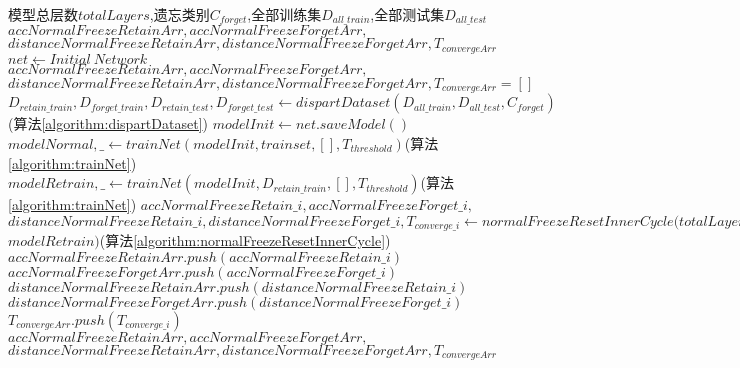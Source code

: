 \begin{algorithm}
	\renewcommand{\algorithmicrequire}{\textbf{Input:}}
	\renewcommand{\algorithmicensure}{\textbf{Output:}}
	\caption{正向冻结主算法 normalResetMain}
	\label{algorithm:normalResetMain}
	\begin{algorithmic}[1]
        \REQUIRE 模型总层数$totalLayers$,遗忘类别$C_{forget}$,全部训练集$D_{all\_train}$,全部测试集$D_{all\_test}$
        \ENSURE  $accNormalFreezeRetainArr,accNormalFreezeForgetArr,$\\$distanceNormalFreezeRetainArr,distanceNormalFreezeForgetArr,T_{convergeArr}$
        \STATE $net \gets Initial\ Network$
        \STATE $accNormalFreezeRetainArr,accNormalFreezeForgetArr,$\\$distanceNormalFreezeRetainArr,distanceNormalFreezeForgetArr,T_{convergeArr} = []$
        \STATE $D_{retain\_train}, D_{forget\_train}, D_{retain\_test}, D_{forget\_test} \gets dispartDataset(D_{all\_train}, D_{all\_test}, C_{forget})$(算法\ref{algorithm:dispartDataset})
        \STATE $modelInit \gets net.saveModel()$
        \STATE $modelNormal,\_ \gets trainNet(modelInit, trainset, [], T_{threshold})$(算法\ref{algorithm:trainNet})
        \STATE $modelRetrain,\_ \gets trainNet(modelInit, D_{retain\_train}, [], T_{threshold})$(算法\ref{algorithm:trainNet})
            \STATE $accNormalFreezeRetain\_i,accNormalFreezeForget\_i,$\\
            $distanceNormalFreezeRetain\_i,distanceNormalFreezeForget\_i,T_{converge\_i} \gets normalFreezeResetInnerCycle(totalLayers, i, C_{forget}, D_{retain\_train}, D_{retain\_test}, D_{forget\_test}, $\\$modelRetrain)$(算法\ref{algorithm:normalFreezeResetInnerCycle})
            \STATE $accNormalFreezeRetainArr.push(accNormalFreezeRetain\_i)$
            \STATE $accNormalFreezeForgetArr.push(accNormalFreezeForget\_i)$
            \STATE $distanceNormalFreezeRetainArr.push(distanceNormalFreezeRetain\_i)$
            \STATE $distanceNormalFreezeForgetArr.push(distanceNormalFreezeForget\_i)$
            \STATE $T_{convergeArr}.push(T_{converge\_i})$
        \ENDFOR
        \RETURN $accNormalFreezeRetainArr,accNormalFreezeForgetArr,$\\$distanceNormalFreezeRetainArr,distanceNormalFreezeForgetArr,T_{convergeArr}$
	\end{algorithmic}  
\end{algorithm}

